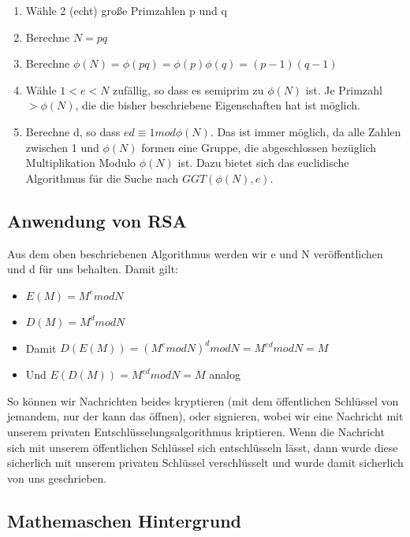 \documentclass[12pt,a4paper]{article}
\theoremstyle{definition}
\begin{document}
    \begin{enumerate}
        \item Wähle 2 (echt) große Primzahlen p und q
        \item Berechne $N = pq$
        \item Berechne $\phi(N) = \phi(pq) = \phi(p) \phi(q) = (p-1)(q-1)$
        \item Wähle $1 < e < N$ zufällig, so dass es semiprim zu $\phi(N)$ ist. Je Primzahl $> \phi(N)$, die die
            bisher beschriebene Eigenschaften hat ist möglich.
        \item Berechne d, so dass $ed \equiv 1 mod \phi(N)$. Das ist immer möglich, da alle Zahlen zwischen 1 und
            $\phi(N)$ formen eine Gruppe, die abgeschlossen bezüglich Multiplikation Modulo $\phi(N)$ ist.
            Dazu bietet sich das euclidische Algorithmus für die Suche nach $GGT(\phi(N), e)$.
    \end{enumerate}

    \subsection{Anwendung von RSA}

    Aus dem oben beschriebenen Algorithmus werden wir e und N veröffentlichen und d für uns behalten. Damit gilt:

    \begin{itemize}
        \item $E(M) = M^e mod N$
        \item $D(M) = M^d mod N$
        \item Damit $D(E(M)) = (M^e mod N)^d mod N = M^{ed} mod N = M$
        \item Und $E(D(M)) = M^{ed} mod N = M$ analog
    \end{itemize}

    So können wir Nachrichten beides kryptieren (mit dem öffentlichen Schlüssel von jemandem, nur der kann das öffnen),
    oder signieren, wobei wir eine Nachricht mit unserem privaten Entschlüsselungsalgorithmus kriptieren. Wenn die
    Nachricht sich mit unserem öffentlichen Schlüssel sich entschlüsseln lässt, dann wurde diese sicherlich mit unserem
    privaten Schlüssel verschlüsselt und wurde damit sicherlich von uns geschrieben.

    \subsection{Mathemaschen Hintergrund}
\end{document}
